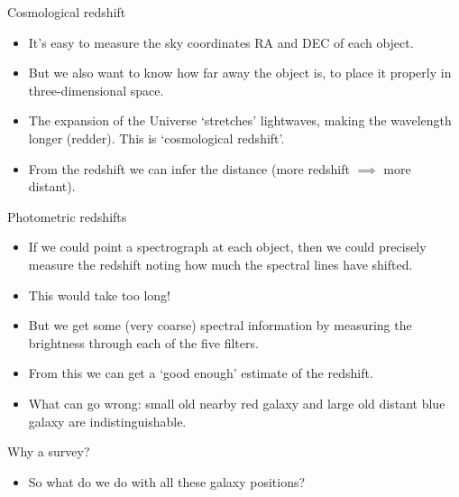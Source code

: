 \documentclass[usenames,dvipsnames]{beamer}
\begin{document}
\begin{frame}{Cosmological redshift}
  \begin{block}{}
    \begin{itemize}
      \item{It's easy to measure the sky coordinates RA and DEC of each object.}
      \item{But we also want to know how far away the object is, to place it properly in three-dimensional space.}
      \item{The expansion of the Universe `stretches' lightwaves, making the wavelength longer (redder). This is `cosmological redshift'.}
      \item{From the redshift we can infer the distance (more redshift $\implies$ more distant).}
    \end{itemize}
  \end{block}
\end{frame}


\begin{frame}{Photometric redshifts}
  \begin{block}{}
    \begin{itemize}
      \item{If we could point a spectrograph at each object, then we could precisely measure the redshift noting how much the spectral lines have shifted.}
      \item{This would take too long!}
      \item{But we get some (very coarse) spectral information by measuring the brightness through each of the five filters.}
      \item{From this we can get a `good enough' estimate of the redshift.}
      \item{What can go wrong: small old nearby red galaxy and large old distant blue galaxy are indistinguishable.}
    \end{itemize}
  \end{block}
\end{frame}

\begin{frame}{Why a survey?}
  \begin{block}{}
    \begin{itemize}
      \item{So what do we do with all these galaxy positions?}
    \end{itemize}
  \end{block}
\end{frame}
\end{document}
